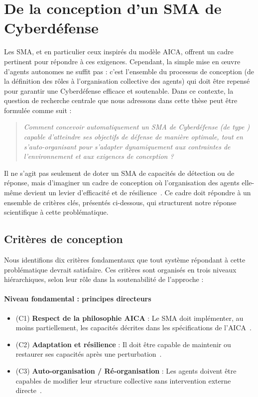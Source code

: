 \section{De la conception d'un SMA de Cyberdéfense}\label{sec:problematique-sma}

Les \ac{SMA}, et en particulier ceux inspirés du modèle \ac{AICA}, offrent un cadre pertinent pour répondre à ces exigences. Cependant, la simple mise en œuvre d'agents autonomes ne suffit pas : c'est l'ensemble du processus de conception (de la définition des rôles à l'organisation collective des agents) qui doit être repensé pour garantir une Cyberdéfense efficace et soutenable.
Dans ce contexte, la question de recherche centrale que nous adressons dans cette thèse peut être formulée comme suit :

\begin{quote}
    \emph{Comment concevoir automatiquement un \ac{SMA} de Cyberdéfense (de type ) capable d'atteindre ses objectifs de défense de manière optimale, tout en s'auto-organisant pour s'adapter dynamiquement aux contraintes de l'environnement et aux exigences de conception ?}
\end{quote}

Il ne s'agit pas seulement de doter un \ac{SMA} de capacités de détection ou de réponse, mais d'imaginer un cadre de conception où l'organisation des agents elle-même devient un levier d'efficacité et de résilience~\cite{Picard2006, DiMarzoSerugendo2006}. Ce cadre doit répondre à un ensemble de critères clés, présentés ci-dessous, qui structurent notre réponse scientifique à cette problématique.

\subsection*{Critères de conception}

Nous identifions dix critères fondamentaux que tout système répondant à cette problématique devrait satisfaire. Ces critères sont organisés en trois niveaux hiérarchiques, selon leur rôle dans la soutenabilité de l'approche :

\paragraph{Niveau fondamental : principes directeurs}
\begin{itemize}
    \item (C1) \textbf{Respect de la philosophie \ac{AICA}} : Le \ac{SMA} doit implémenter, au moins partiellement, les capacités décrites dans les spécifications de l'\ac{AICA}~\cite{Kott2023}.
    \item (C2) \textbf{Adaptation et résilience} : Il doit être capable de maintenir ou restaurer ses capacités après une perturbation~\cite{Bodeau2011}.
    \item (C3) \textbf{Auto-organisation / Ré-organisation} : Les agents doivent être capables de modifier leur structure collective sans intervention externe directe~\cite{DiMarzoSerugendo2006}.
\end{itemize}

